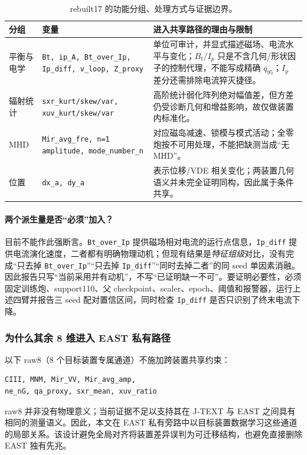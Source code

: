 \documentclass[11pt,a4paper]{article}
\newcommand{\code}[1]{\texttt{\small #1}}
\begin{document}
\begin{table}[H]
\centering
\caption{rebuilt17 的功能分组、处理方式与证据边界。}
\small
\begin{tabularx}{\textwidth}{p{27mm} p{54mm} Y}
\toprule
分组 & 变量 & 进入共享路径的理由与限制\\
\midrule
平衡与电学 & \code{Bt, ip\_A, Bt\_over\_Ip, Ip\_diff, v\_loop, Z\_proxy} & 单位可审计，并显式描述磁场、电流水平与变化；\(B_t/I_p\) 只是不含几何/形状因子的控制代理，不能写成精确 \(q_{95}\)；\(I_p\) 差分还需排除电流猝灭捷径。\\
辐射统计 & \code{sxr\_kurt/skew/var, xuv\_kurt/skew/var} & 高阶统计弱化阵列绝对幅值差，但方差仍受诊断几何和增益影响，故仅做装置内标准化。\\
MHD & \code{Mir\_avg\_fre, n=1 amplitude, mode\_number\_n} & 对应磁岛减速、锁模与模式活动；全零炮按不可用处理，不能把缺测当成“无 MHD”。\\
位置 & \code{dx\_a, dy\_a} & 表示位移/VDE 相关变化；两装置几何语义并未完全证明同构，因此属于条件共享。\\
\bottomrule
\end{tabularx}
\end{table}

\paragraph{两个派生量是否“必须”加入？}
目前不能作此强断言。\code{Bt\_over\_Ip} 提供磁场相对电流的运行点信息，\code{Ip\_diff} 提供电流演化速度，二者都有明确物理动机；但现有结果是\emph{特征组级}对比，没有完成“只去掉 \code{Bt\_over\_Ip}”“只去掉 \code{Ip\_diff}”“同时去掉二者”的同 seed 单因素消融。因此报告只写“当前采用并有动机”，不写“已证明缺一不可”。要证明必要性，必须固定训练炮、support110、父 checkpoint、scaler、epoch、阈值和报警器，运行上述四臂并报告三 seed 配对置信区间，同时检查 \code{Ip\_diff} 是否只识别了终末电流下降。

\subsubsection{为什么其余 8 维进入 EAST 私有路径}

以下 raw8（8 个目标装置专属通道）不施加跨装置共享约束：

\begin{lstlisting}
CIII, MNM, Mir_VV, Mir_avg_amp,
ne_nG, qa_proxy, sxr_mean, xuv_ratio
\end{lstlisting}

raw8 并非没有物理意义；当前证据不足以支持其在 J-TEXT 与 EAST 之间具有相同的测量语义。因此，本文在 EAST 私有旁路中以目标装置数据学习这些通道的局部关系。该设计避免全局对齐将装置差异误判为可迁移结构，也避免直接删除 EAST 独有先兆。
\end{document}
